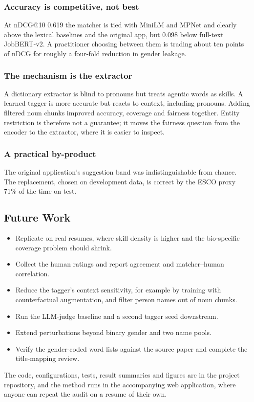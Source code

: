 \documentclass[conference,a4paper]{IEEEtran}
\begin{document}
\subsubsection{Accuracy is competitive, not best} At nDCG@10 0.619 the matcher is tied with MiniLM and MPNet and clearly above the lexical baselines and the original app, but 0.098 below full-text JobBERT-v2. A practitioner choosing between them is trading about ten points of nDCG for roughly a four-fold reduction in gender leakage.

\subsubsection{The mechanism is the extractor} A dictionary extractor is blind to pronouns but treats agentic words as skills. A learned tagger is more accurate but reacts to context, including pronouns. Adding filtered noun chunks improved accuracy, coverage and fairness together. Entity restriction is therefore not a guarantee; it moves the fairness question from the encoder to the extractor, where it is easier to inspect.

\subsubsection{A practical by-product} The original application's suggestion band was indistinguishable from chance. The replacement, chosen on development data, is correct by the ESCO proxy 71\% of the time on test.

\subsection{Future Work}
\begin{itemize}
\item Replicate on real resumes, where skill density is higher and the bio-specific coverage problem should shrink.
\item Collect the human ratings and report agreement and matcher–human correlation.
\item Reduce the tagger's context sensitivity, for example by training with counterfactual augmentation, and filter person names out of noun chunks.
\item Run the LLM-judge baseline and a second tagger seed downstream.
\item Extend perturbations beyond binary gender and two name pools.
\item Verify the gender-coded word lists against the source paper and complete the title-mapping review.
\end{itemize}
The code, configurations, tests, result summaries and figures are in the project repository, and the method runs in the accompanying web application, where anyone can repeat the audit on a resume of their own.
\end{document}
